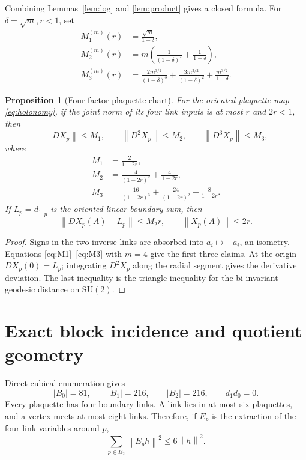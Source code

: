 \documentclass[11pt]{article}
\newtheorem{proposition}[theorem]{Proposition}
\theoremstyle{definition}
\newcommand{\SU}{\mathrm{SU}(2)}
\newcommand{\norm}[1]{\left\lVert #1\right\rVert}
\begin{document}
Combining Lemmas~\ref{lem:log} and \ref{lem:product} gives a closed formula.
For $\delta=\sqrt m,r<1$, set
\begin{align}
 M_1^{(m)}(r)&=\frac{\sqrt m}{1-\delta},\label{eq:M1}\\
 M_2^{(m)}(r)&=m\left(\frac1{(1-\delta)^2}+\frac1{1-\delta}\right),\label{eq:M2}\\
 M_3^{(m)}(r)&=\frac{2m^{3/2}}{(1-\delta)^3}
 +\frac{3m^{3/2}}{(1-\delta)^2}
 +\frac{m^{3/2}}{1-\delta}.
\label{eq:M3}
\end{align}

\begin{proposition}[Four-factor plaquette chart]\label{prop:plaquette}
For the oriented plaquette map \eqref{eq:holonomy}, if the joint norm of its
four link inputs is at most $r$ and $2r<1$, then
\[
 \norm{DX_p}\le M_1,\qquad
 \norm{D^2X_p}\le M_2,\qquad
 \norm{D^3X_p}\le M_3,
\]
where
\begin{align*}
 M_1&=\frac2{1-2r},\\
 M_2&=\frac4{(1-2r)^2}+\frac4{1-2r},\\
 M_3&=\frac{16}{(1-2r)^3}
       +\frac{24}{(1-2r)^2}+\frac8{1-2r}.
\end{align*}
If $L_p=d_1|_p$ is the oriented linear boundary sum, then
\begin{equation}\label{eq:localdeviation}
 \norm{DX_p(A)-L_p}\le M_2r,\qquad \norm{X_p(A)}\le2r.
\end{equation}
\end{proposition}

\begin{proof}
Signs in the two inverse links are absorbed into $a_i\mapsto-a_i$, an
isometry.  Equations \eqref{eq:M1}--\eqref{eq:M3} with $m=4$ give the first
three claims.  At the origin $DX_p(0)=L_p$; integrating $D^2X_p$ along the
radial segment gives the derivative deviation.  The last inequality is the
triangle inequality for the bi-invariant geodesic distance on $\SU$.
\end{proof}

\section{Exact block incidence and quotient geometry}\label{sec:incidence}

Direct cubical enumeration gives
\[
 |B_0|=81,\qquad |B_1|=216,\qquad |B_2|=216,\qquad d_1d_0=0.
\]
Every plaquette has four boundary links.  A link lies in at most six
plaquettes, and a vertex meets at most eight links.  Therefore, if $E_p$ is
the extraction of the four link variables around $p$,
\begin{equation}\label{eq:incidence}
 \sum_{p\in B_2}\norm{E_ph}^2\le6\norm h^2.
\end{equation}
\end{document}
